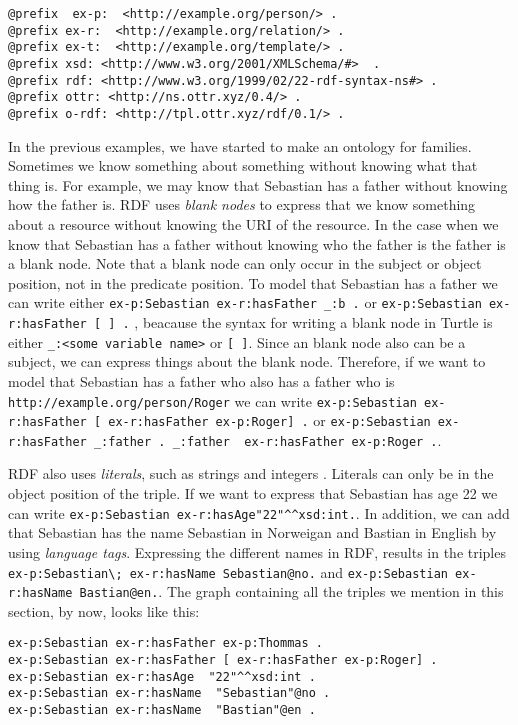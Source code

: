 \begin{lstlisting}[frame=single, language=turtle]
@prefix  ex-p:  <http://example.org/person/> . 
@prefix ex-r:  <http://example.org/relation/> . 
@prefix ex-t:  <http://example.org/template/> . 
@prefix xsd: <http://www.w3.org/2001/XMLSchema/#>  . 
@prefix rdf: <http://www.w3.org/1999/02/22-rdf-syntax-ns#> .
@prefix ottr: <http://ns.ottr.xyz/0.4/> .
@prefix o-rdf: <http://tpl.ottr.xyz/rdf/0.1/> .
\end{lstlisting}

\para
In the previous examples, we have started to make an ontology for families. Sometimes we know something about something without knowing what that thing is. For example, we may know that Sebastian has a father without knowing how the father is. RDF uses \emph{blank nodes} to express that we know something about a resource without knowing the URI of the resource. In the case when we know that Sebastian has a father without knowing who the father is the father is a blank node. Note that a blank node can only  occur in the subject or object position, not in the predicate position. To model that Sebastian has a father we can write either \lstinline{ex-p:Sebastian ex-r:hasFather _:b .} or \lstinline{ex-p:Sebastian ex-r:hasFather [ ] .} , beacause the syntax for writing a blank node in Turtle is either \lstinline{_:<some variable name>} or \lstinline{[ ]}. Since an blank node also can be a subject, we can express things about the blank node. Therefore, if we want to model that Sebastian has a father who also has a father who is \lstinline{http://example.org/person/Roger} we can write \lstinline{ex-p:Sebastian ex-r:hasFather [ ex-r:hasFather ex-p:Roger] .} or \lstinline{ex-p:Sebastian ex-r:hasFather _:father . _:father  ex-r:hasFather ex-p:Roger .}.

\para
RDF also uses \emph{literals}, such as strings and integers \autocite{W3C_RDF}. Literals can only be in the object position of the triple. If we want to express that Sebastian has age 22 we can write \lstinline{ex-p:Sebastian ex-r:hasAge"22"^^xsd:int.}. In addition, we can add that Sebastian has the name Sebastian in Norweigan and Bastian in English by using \emph{language tags}. Expressing the different names in RDF, results in the triples \lstinline{ex-p:Sebastian\; ex-r:hasName Sebastian@no.} and \lstinline{ex-p:Sebastian ex-r:hasName Bastian@en.}. The graph containing all the triples we mention in this section, by now, looks like this:

\begin{lstlisting}[frame=single, language=turtle]
ex-p:Sebastian ex-r:hasFather ex-p:Thommas .
ex-p:Sebastian ex-r:hasFather [ ex-r:hasFather ex-p:Roger] . 
ex-p:Sebastian ex-r:hasAge  "22"^^xsd:int . 
ex-p:Sebastian ex-r:hasName  "Sebastian"@no . 
ex-p:Sebastian ex-r:hasName  "Bastian"@en .
\end{lstlisting}

